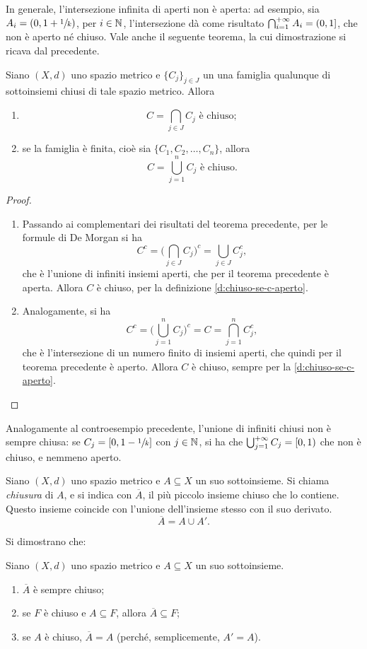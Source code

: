 In generale, l'intersezione infinita di aperti non è aperta: ad esempio, sia $A_i=(0,1+\sfrac{1}{k})$, per $i\in\mathbb{N}$, l'intersezione dà come risultato $\bigcap_{i=1}^{+\infty}A_i=(0,1]$, che non è aperto né chiuso.
Vale anche il seguente teorema, la cui dimostrazione si ricava dal precedente.
\begin{teorema} \label{t:unione-intersezione-chiusi}
Siano $(X,d)$ uno spazio metrico e $\{C_j\}_{j\in J}$ un una famiglia qualunque di sottoinsiemi chiusi di tale spazio metrico. Allora
\begin{enumerate}
\item\[
C=\bigcap_{j\in J} C_j\text{ è chiuso};
\]
\item se la famiglia è finita, cioè sia $\{C_1,C_2,\dots,C_n\}$, allora
\[
C=\bigcup_{j=1}^n C_j\text{ è chiuso}.
\]
\end{enumerate}
\end{teorema}
\begin{proof}
\begin{enumerate}
\item Passando ai complementari dei risultati del teorema precedente, per le formule di De Morgan si ha
\[
C^c=\bigg(\bigcap_{j\in J} C_j\bigg)^c=\bigcup_{j\in J} C^c_j,
\]
che è l'unione di infiniti insiemi aperti, che per il teorema precedente è aperta. Allora $C$ è chiuso, per la definizione \ref{d:chiuso-se-c-aperto}.
\item Analogamente, si ha
\[
C^c=\bigg(\bigcup_{j=1}^n C_j\bigg)^c=C=\bigcap_{j=1}^n C^c_j,
\]
che è l'intersezione di un numero finito di insiemi aperti, che quindi per il teorema precedente è aperto. Allora $C$ è chiuso, sempre per la \ref{d:chiuso-se-c-aperto}.\qedhere
\end{enumerate}
\end{proof}
Analogamente al controesempio precedente, l'unione di infiniti chiusi non è sempre chiusa: se $C_j=[0,1-\sfrac{1}{k}]$ con $j\in\mathbb{N}$, si ha che $\bigcup_{j=1}^{+\infty}C_j=[0,1)$ che non è chiuso, e nemmeno aperto.
\begin{definizione}
Siano $(X,d)$ uno spazio metrico e $A\subseteq X$ un suo sottoinsieme. Si chiama \emph{chiusura} di $A$, e si indica con $\overline{A}$, il più piccolo insieme chiuso che lo contiene. Questo insieme coincide con l'unione dell'insieme stesso con il suo derivato.
\[
\overline{A}=A\cup A'.
\]
\end{definizione}
Si dimostrano che:
\begin{teorema}
Siano $(X,d)$ uno spazio metrico e $A\subseteq X$ un suo sottoinsieme. 
\begin{enumerate}
\item $\overline{A}$ è sempre chiuso;
\item se $F$ è chiuso e $A\subseteq F$, allora $\overline{A}\subseteq F$;
\item se $A$ è chiuso, $\overline{A}=A$ (perché, semplicemente, $A'=A$).
\end{enumerate}
\end{teorema}
